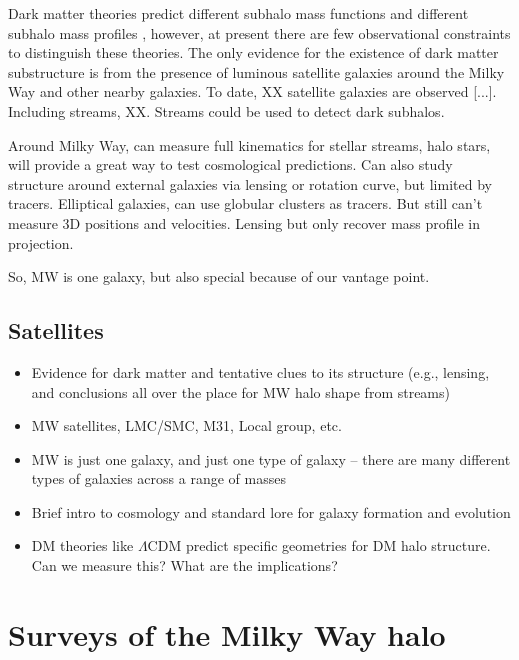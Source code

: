 Dark matter theories predict different subhalo mass functions and different subhalo mass profiles \citep{todo, WDM, CDM, SIDM}, however, at present there are few observational constraints to distinguish these theories. The only evidence for the existence of dark matter substructure is from the presence of luminous satellite galaxies around the Milky Way and other nearby galaxies. To date, XX satellite galaxies are observed [...]. Including streams, XX. Streams could be used to detect dark subhalos. 

Around Milky Way, can measure full kinematics for stellar streams, halo stars, will provide a great way to test cosmological predictions. Can also study structure around external galaxies via lensing or rotation curve, but limited by tracers. Elliptical galaxies, can use globular clusters as tracers. But still can't measure 3D positions and velocities. Lensing but only recover mass profile in projection. 

So, MW is one galaxy, but also special because of our vantage point.

\subsection{Satellites}

\begin{itemize}
	\item Evidence for dark matter and tentative clues to its structure (e.g., lensing, and conclusions all over the place for MW halo shape from streams)
	\item MW satellites, LMC/SMC, M31, Local group, etc.
	\item MW is just one galaxy, and just one type of galaxy -- there are many different types of galaxies across a range of masses
	\item Brief intro to cosmology and standard lore for galaxy formation and evolution
	\item DM theories like $\Lambda$CDM predict specific geometries for DM halo structure. Can we measure this? What are the implications?
\end{itemize}

\section{Surveys of the Milky Way halo}\label{sec:surveys}


